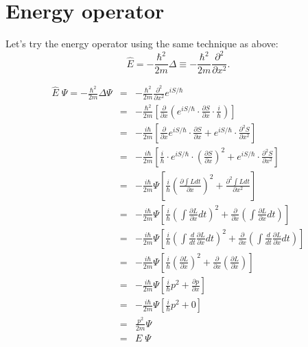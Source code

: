 \section{Energy operator}
\label{sec:energy-operator}

Let's try the energy operator using the same technique as above:
\begin{equation}
\hat{E} = - \frac{\hbar^2}{2 m} \Delta \equiv - \frac{\hbar^2}{2 m} \frac{\partial^2}{\partial x^2} .
\end{equation}

\begin{eqnarray}
\hat{E} \; \Psi = - \frac{\hbar^2}{2 m} \Delta \Psi
&=& - \frac{\hbar^2}{2 m} \frac{\partial^2}{\partial x^2} e^{i S / \hbar} \nonumber \\
&=& - \frac{\hbar^2}{2 m} \left[ \frac{\partial}{\partial x} \left( e^{i S / \hbar} \cdot \frac{\partial S}{\partial x} \cdot \frac{i}{\hbar} \right)  \right] \nonumber \\
&=& - \frac{i \hbar}{2 m} \left[ \frac{\partial}{\partial x} e^{i S / \hbar} \cdot \frac{\partial S}{\partial x}  + e^{i S / \hbar} \cdot \frac{\partial^2 S}{\partial x^2} \right] \nonumber \\
&=& - \frac{i \hbar}{2 m} \left[ \frac{i}{\hbar} \cdot e^{i S / \hbar} \cdot \left( \frac{\partial S}{\partial x} \right)^2  + e^{i S / \hbar} \cdot \frac{\partial^2 S}{\partial x^2} \right] \nonumber \\
&=& - \frac{i \hbar}{2 m} \Psi \left[ \frac{i}{\hbar} \left( \frac{\partial \int L dt}{\partial x} \right)^2  + \frac{\partial^2 \int L dt}{\partial x^2} \right] \nonumber \\
&=& - \frac{i \hbar}{2 m} \Psi \left[ \frac{i}{\hbar} \left( \int \frac{\partial L}{\partial x} dt \right)^2  + \frac{\partial}{\partial x} \left( \int \frac{\partial L}{\partial x} dt \right) \right] \nonumber \\
&=& - \frac{i \hbar}{2 m} \Psi \left[ \frac{i}{\hbar} \left( \int \frac{d}{dt} \frac{\partial L}{\partial \dot{x}} dt \right)^2  + \frac{\partial}{\partial x} \left( \int \frac{d}{dt} \frac{\partial L}{\partial \dot{x}} dt \right) \right] \nonumber \\
&=& - \frac{i \hbar}{2 m} \Psi \left[ \frac{i}{\hbar} \left( \frac{\partial L}{\partial \dot{x}} \right)^2  + \frac{\partial}{\partial x} \left( \frac{\partial L}{\partial \dot{x}} \right) \right] \nonumber \\
&=& - \frac{i \hbar}{2 m} \Psi \left[ \frac{i}{\hbar} p^2  + \frac{\partial p}{\partial x} \right] \nonumber \\
&=& - \frac{i \hbar}{2 m} \Psi \left[ \frac{i}{\hbar} p^2  + 0 \right] \nonumber \\
&=& \frac{p^2}{2 m} \Psi \nonumber \\
&=& E \; \Psi
\end{eqnarray}

